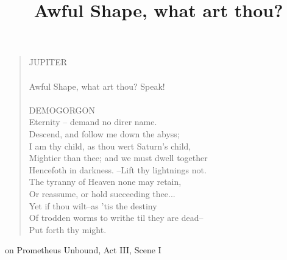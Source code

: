 \documentclass[12pt]{article}
\title{Awful Shape, what art thou?}
\begin{document}
\begin{verse}
  JUPITER \\
  [...] \\
  Awful Shape, what art thou? Speak! \\
  \\
  DEMOGORGON \\
  Eternity -- demand no direr name. \\
  Descend, and follow me down the abyss; \\
  I am thy child, as thou wert Saturn's child, \\
  Mightier than thee; and we must dwell together \\
  Hencefoth in darkness. --Lift thy lightnings not. \\
  The tyranny of Heaven none may retain, \\
  Or reassume, or hold succeeding thee... \\
  Yet if thou wilt--as 'tis the destiny \\
  Of trodden worms to writhe til they are dead-- \\
  Put forth thy might.
\end{verse}

on Prometheus Unbound, Act III, Scene I \nocite{shelley2002shelley}
\end{document}
